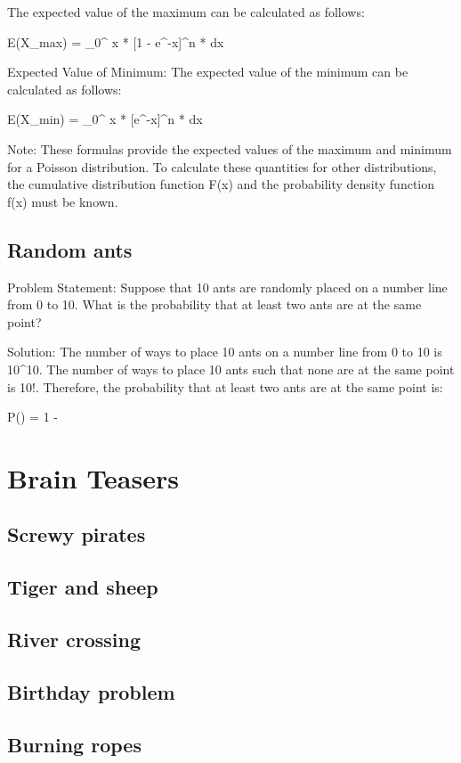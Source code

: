 \documentclass[12pt, a4paper, oneside]{article}
\begin{document}
The expected value of the maximum can be calculated as follows:

E(X_{max}) = \int_{0}^{\infty} x * [1 - e^{-\lambda x}]^{n} *  dx

Expected Value of Minimum:
The expected value of the minimum can be calculated as follows:

E(X_{min}) = \int_{0}^{\infty} x * [e^{-\lambda x}]^{n} *  dx

Note: These formulas provide the expected values of the maximum and minimum for a Poisson distribution. To calculate these quantities for other distributions, the cumulative distribution function F(x) and the probability density function f(x) must be known.
\subsection{ Random ants}
Problem Statement:
Suppose that 10 ants are randomly placed on a number line from 0 to 10. What is the probability that at least two ants are at the same point?

Solution:
The number of ways to place 10 ants on a number line from 0 to 10 is 10^10.
The number of ways to place 10 ants such that none are at the same point is 10!.
Therefore, the probability that at least two ants are at the same point is:

P() = 1 - 

\section{Brain Teasers  }
\subsection{ Screwy pirates }
\subsection{ Tiger and sheep }
\subsection{ River crossing }
\subsection{ Birthday problem }
\subsection{ Burning ropes }
\end{document}
